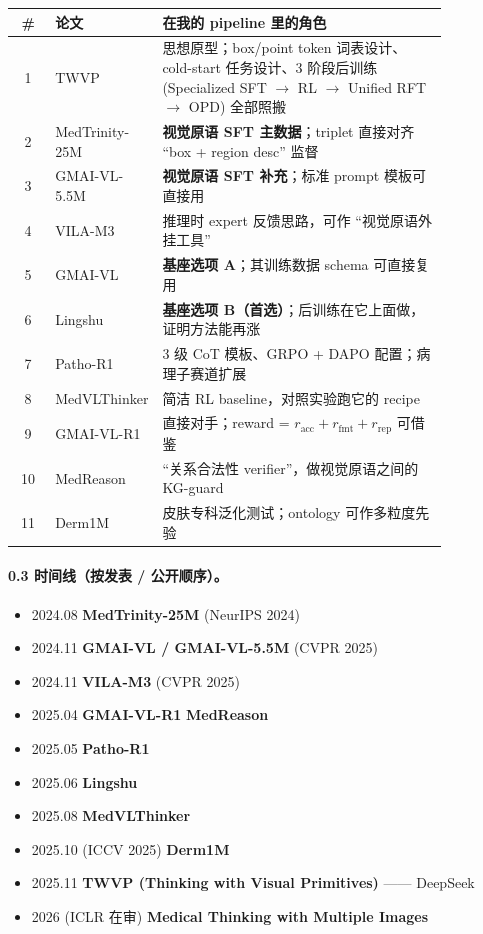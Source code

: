 \begin{center}
\renewcommand{\arraystretch}{1.3}
\setlength{\tabcolsep}{4pt}
\footnotesize
\begin{tabular}{|c|p{0.20\linewidth}|p{0.66\linewidth}|}
\hline
\# & 论文 & 在我的 pipeline 里的角色 \\
\hline
1 & TWVP & 思想原型；box/point token 词表设计、cold-start 任务设计、3 阶段后训练 (Specialized SFT $\to$ RL $\to$ Unified RFT $\to$ OPD) 全部照搬 \\
\hline
2 & MedTrinity-25M & \textbf{视觉原语 SFT 主数据}；triplet 直接对齐 ``box + region desc'' 监督 \\
\hline
3 & GMAI-VL-5.5M & \textbf{视觉原语 SFT 补充}；标准 prompt 模板可直接用 \\
\hline
4 & VILA-M3 & 推理时 expert 反馈思路，可作 ``视觉原语外挂工具'' \\
\hline
5 & GMAI-VL & \textbf{基座选项 A}；其训练数据 schema 可直接复用 \\
\hline
6 & Lingshu & \textbf{基座选项 B（首选）}；后训练在它上面做，证明方法能再涨 \\
\hline
7 & Patho-R1 & 3 级 CoT 模板、GRPO + DAPO 配置；病理子赛道扩展 \\
\hline
8 & MedVLThinker & 简洁 RL baseline，对照实验跑它的 recipe \\
\hline
9 & GMAI-VL-R1 & 直接对手；reward = $r_\text{acc} + r_\text{fmt} + r_\text{rep}$ 可借鉴 \\
\hline
10 & MedReason & ``关系合法性 verifier''，做视觉原语之间的 KG-guard \\
\hline
11 & Derm1M & 皮肤专科泛化测试；ontology 可作多粒度先验 \\
\hline
\end{tabular}
\end{center}

\paragraph{0.3 时间线（按发表 / 公开顺序）。}

\begin{itemize}[leftmargin=1.5em]
  \item 2024.08 \textbf{MedTrinity-25M} (NeurIPS 2024)
  \item 2024.11 \textbf{GMAI-VL / GMAI-VL-5.5M} (CVPR 2025)
  \item 2024.11 \textbf{VILA-M3} (CVPR 2025)
  \item 2025.04 \textbf{GMAI-VL-R1} \textbf{MedReason}
  \item 2025.05 \textbf{Patho-R1}
  \item 2025.06 \textbf{Lingshu}
  \item 2025.08 \textbf{MedVLThinker}
  \item 2025.10 (ICCV 2025) \textbf{Derm1M}
  \item 2025.11 \textbf{TWVP (Thinking with Visual Primitives)} —— DeepSeek
  \item 2026 (ICLR 在审) \textbf{Medical Thinking with Multiple Images}
\end{itemize}

